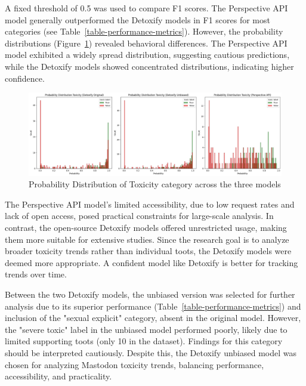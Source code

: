 A fixed threshold of 0.5 was used to compare F1 scores. The Perspective API model generally outperformed the Detoxify models in F1 scores for most categories (see Table~\ref{table-performance-metrics}). However, the probability distributions (Figure~\ref{probability-distribution}) revealed behavioral differences. The Perspective API model exhibited a widely spread distribution, suggesting cautious predictions, while the Detoxify models showed concentrated distributions, indicating higher confidence.

\begin{figure}[tb]
    \centering
    \includegraphics[width=\textwidth]{../material/probability_distribution.png}
    \caption{Probability Distribution of Toxicity category across the three models}
    \label{probability-distribution}
\end{figure}

The Perspective API model's limited accessibility, due to low request rates and lack of open access, posed practical constraints for large-scale analysis. In contrast, the open-source Detoxify models offered unrestricted usage, making them more suitable for extensive studies. Since the research goal is to analyze broader toxicity trends rather than individual toots, the Detoxify models were deemed more appropriate. A confident model like Detoxify is better for tracking trends over time.

Between the two Detoxify models, the unbiased version was selected for further analysis due to its superior performance (Table~\ref{table-performance-metrics}) and inclusion of the "sexual explicit" category, absent in the original model. However, the "severe toxic" label in the unbiased model performed poorly, likely due to limited supporting toots (only 10 in the dataset). Findings for this category should be interpreted cautiously. Despite this, the Detoxify unbiased model was chosen for analyzing Mastodon toxicity trends, balancing performance, accessibility, and practicality.

